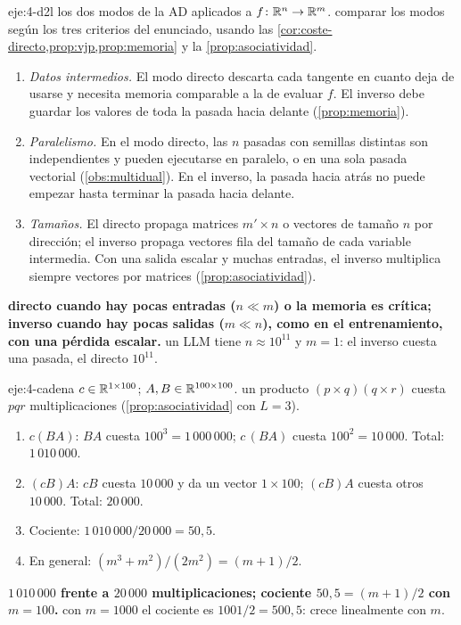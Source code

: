 \begin{solucion}{eje:4-d2l}
\datos los dos modos de la AD aplicados a $f\colon\mathbb{R}^{n}\to\mathbb{R}^{m}$.
\planteamiento comparar los modos según los tres criterios del enunciado, usando las \cref{cor:coste-directo,prop:vjp,prop:memoria} y la \cref{prop:asociatividad}.
\pasos
\begin{enumerate}[label=\arabic*.]
  \item \emph{Datos intermedios.} El modo directo descarta cada tangente en cuanto deja de usarse y necesita memoria comparable a la de evaluar $f$. El inverso debe guardar los valores de toda la pasada hacia delante (\cref{prop:memoria}).
  \item \emph{Paralelismo.} En el modo directo, las $n$ pasadas con semillas distintas son independientes y pueden ejecutarse en paralelo, o en una sola pasada vectorial (\cref{obs:multidual}). En el inverso, la pasada hacia atrás no puede empezar hasta terminar la pasada hacia delante.
  \item \emph{Tamaños.} El directo propaga matrices $m'\times n$ o vectores de tamaño $n$ por dirección; el inverso propaga vectores fila del tamaño de cada variable intermedia. Con una salida escalar y muchas entradas, el inverso multiplica siempre vectores por matrices (\cref{prop:asociatividad}).
\end{enumerate}
\resultado \textbf{directo cuando hay pocas entradas ($n\ll m$) o la memoria es crítica; inverso cuando hay pocas salidas ($m\ll n$), como en el entrenamiento, con una pérdida escalar.}
\comprobacion un LLM tiene $n\approx 10^{11}$ y $m=1$: el inverso cuesta una pasada, el directo $10^{11}$.
\end{solucion}

\begin{solucion}{eje:4-cadena}
\datos $c\in\mathbb{R}^{1\times 100}$; $A,B\in\mathbb{R}^{100\times 100}$.
\planteamiento un producto $(p\times q)(q\times r)$ cuesta $pqr$ multiplicaciones (\cref{prop:asociatividad} con $L=3$).
\pasos
\begin{enumerate}[label=\arabic*.]
  \item $c(BA)$: $BA$ cuesta $100^{3}=1\,000\,000$; $c\,(BA)$ cuesta $100^{2}=10\,000$. Total: $1\,010\,000$.
  \item $(cB)A$: $cB$ cuesta $10\,000$ y da un vector $1\times 100$; $(cB)A$ cuesta otros $10\,000$. Total: $20\,000$.
  \item Cociente: $1\,010\,000/20\,000=50{,}5$.
  \item En general: $(m^{3}+m^{2})/(2m^{2})=(m+1)/2$.
\end{enumerate}
\resultado \textbf{$1\,010\,000$ frente a $20\,000$ multiplicaciones; cociente $50{,}5=(m+1)/2$ con $m=100$.}
\comprobacion con $m=1000$ el cociente es $1001/2=500{,}5$: crece linealmente con $m$.
\end{solucion}

